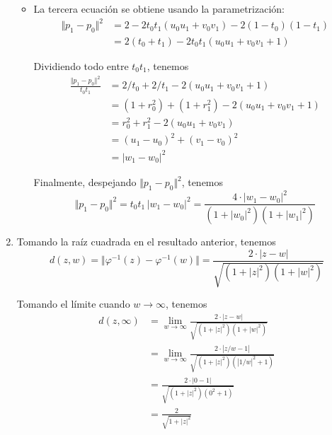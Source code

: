 \begin{solution}
\begin{enumerate}[label=(\alph*)]
\begin{itemize}
        \item La tercera ecuación se obtiene usando la parametrización:
        \begin{align*}
            \Vert p_1 - p_0 \Vert^2
                & = 2 - 2 t_0 t_1 (u_0 u_1 + v_0 v_1) - 2 (1 - t_0) (1 - t_1) \\
                & = 2 (t_0 + t_1) - 2 t_0 t_1 (u_0 u_1 + v_0 v_1 + 1)
        \end{align*}
        
        Dividiendo todo entre $t_0 t_1$, tenemos
        \begin{align*}
            \frac {\Vert p_1 - p_0 \Vert^2} {t_0 t_1}
                & = 2 / t_0 + 2 / t_1 - 2 (u_0 u_1 + v_0 v_1 + 1) \\
                & = (1 + r_0^2) + (1 + r_1^2) - 2 (u_0 u_1 + v_0 v_1 + 1) \\
                & = r_0^2 + r_1^2 - 2 (u_0 u_1 + v_0 v_1) \\
                & = (u_1 - u_0)^2 + (v_1 - v_0)^2 \\
                & = |w_1 - w_0|^2
        \end{align*}
        
        Finalmente, despejando $\Vert p_1 - p_0 \Vert^2$, tenemos
        $$\Vert p_1 - p_0 \Vert^2 = t_0 t_1 \, |w_1 - w_0|^2 = \frac {4 \cdot |w_1 - w_0|^2} {(1 + |w_0|^2) (1 + |w_1|^2)}$$
    \end{itemize}
    
    \item Tomando la raíz cuadrada en el resultado anterior, tenemos
    $$d(z, w) = \Vert \varphi^{-1}(z) - \varphi^{-1}(w) \Vert = \frac {2 \cdot |z - w|} {\sqrt {(1 + |z|^2) (1 + |w|^2)}}$$
    
    Tomando el límite cuando $w \to \infty$, tenemos
    \begin{align*}
        d(z, \infty)
            & = \lim_{w \to \infty} \frac {2 \cdot |z - w|} {\sqrt {(1 + |z|^2) (1 + |w|^2)}} \\
            & = \lim_{w \to \infty} \frac {2 \cdot |z/w - 1|} {\sqrt {(1 + |z|^2) (|1/w|^2 + 1)}} \\
            & = \frac {2 \cdot |0 - 1|} {\sqrt {(1 + |z|^2) (0^2 + 1)}} \\
            & = \frac 2 {\sqrt {1 + |z|^2}}
    \end{align*}
\end{enumerate}
\end{solution}

